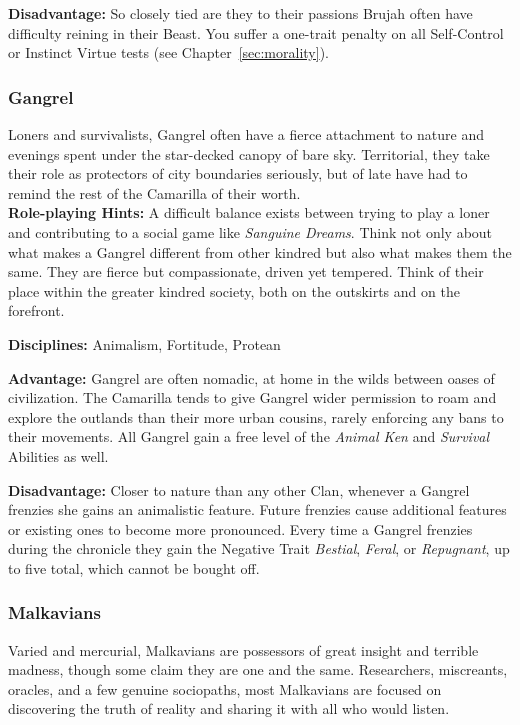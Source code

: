 \textbf{Disadvantage:}  So closely tied are they to their passions Brujah often 
have difficulty reining in their Beast.  You suffer a one-trait penalty on all 
Self-Control or Instinct Virtue tests (see Chapter~\ref{sec:morality}).

\subsubsection{Gangrel}
Loners and survivalists, Gangrel often have a fierce attachment to nature and 
evenings spent under the star-decked canopy of bare sky.  Territorial, they take 
their role as protectors of city boundaries seriously, but of late have had to 
remind the rest of the Camarilla of their worth. \\

\textbf{Role-playing Hints:} A difficult balance exists between trying to play a 
loner and contributing to a social game like \emph{Sanguine Dreams}.  Think not 
only about what makes a Gangrel different from other kindred but also what makes 
them the same.  They are fierce but compassionate, driven yet tempered.  Think of 
their place within the greater kindred society, both on the outskirts and on the 
forefront.

\textbf{Disciplines:}  Animalism, Fortitude, Protean

\textbf{Advantage:}  Gangrel are often nomadic, at home in the wilds between 
oases of civilization.  The Camarilla tends to give Gangrel wider permission to 
roam and explore the outlands than their more urban cousins, rarely enforcing 
any bans to their movements.  All Gangrel gain a free level of the \emph{Animal Ken} 
and \emph{Survival} Abilities as well.

\textbf{Disadvantage:}  Closer to nature than any other Clan, whenever a Gangrel 
frenzies she gains an animalistic feature.  Future frenzies cause additional 
features or existing ones to become more pronounced.  Every time a Gangrel 
frenzies during the chronicle they gain the Negative Trait \emph{Bestial}, 
\emph{Feral}, or \emph{Repugnant}, up to five total, which cannot be bought off.

\subsubsection{Malkavians}
Varied and mercurial, Malkavians are possessors of great insight and terrible 
madness, though some claim they are one and the same.  Researchers, miscreants, 
oracles, and a few genuine sociopaths, most Malkavians are focused on discovering 
the truth of reality and sharing it with all who would listen. \\


